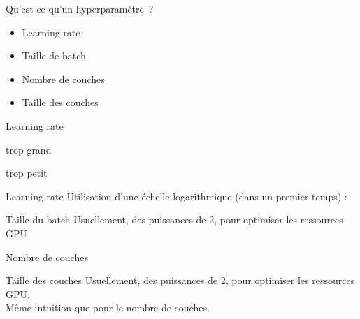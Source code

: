 \begin{frame}{Qu'est-ce qu'un hyperparamètre~?}
  \begin{minipage}[l]{0.49\linewidth}
  \end{minipage}\hfill
  \begin{minipage}[l]{0.49\linewidth}
    \begin{itemize}
      \item Learning rate
      \item Taille de batch
      \item Nombre de couches
      \item Taille des couches
    \end{itemize}
  \end{minipage}\hfill
\end{frame}

\begin{frame}{Learning rate}
  \begin{minipage}[l]{0.49\linewidth}
    \begin{center}trop grand\end{center}
  \end{minipage}\hfill
  \begin{minipage}[l]{0.49\linewidth}
    \begin{center}trop petit\end{center}
  \end{minipage}\hfill

\end{frame}

\begin{frame}{Learning rate}
  Utilisation d'une échelle logarithmique (dans un premier temps) :
\end{frame}

\begin{frame}{Taille du batch}
  Usuellement, des puissances de 2, pour optimiser les ressources GPU
\end{frame}

\begin{frame}{Nombre de couches}
\end{frame}

\begin{frame}{Taille des couches}
  Usuellement, des puissances de 2, pour optimiser les ressources GPU. \\
  Même intuition que pour le nombre de couches.
\end{frame}
